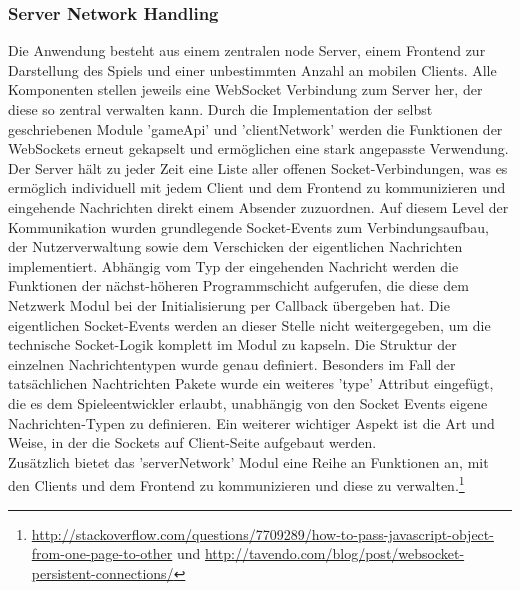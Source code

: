 \documentclass[a4paper]{spie}  %
\begin{document}
\subsubsection{Server Network Handling}
Die Anwendung besteht aus einem zentralen node Server, einem Frontend zur Darstellung des Spiels und einer unbestimmten Anzahl an mobilen Clients. Alle Komponenten stellen jeweils eine WebSocket Verbindung zum Server her, der diese so zentral verwalten kann. Durch die Implementation der selbst geschriebenen Module 'gameApi' und 'clientNetwork' werden die Funktionen der WebSockets erneut gekapselt und ermöglichen eine stark angepasste Verwendung.\\
Der Server hält zu jeder Zeit eine Liste aller offenen Socket-Verbindungen, was es ermöglich individuell mit jedem Client und dem Frontend zu kommunizieren und eingehende Nachrichten direkt einem Absender zuzuordnen. Auf diesem Level der Kommunikation wurden grundlegende Socket-Events zum Verbindungsaufbau, der Nutzerverwaltung sowie dem Verschicken der eigentlichen Nachrichten implementiert. Abhängig vom Typ der eingehenden Nachricht werden die Funktionen der nächst-höheren Programmschicht aufgerufen, die diese dem Netzwerk Modul bei der Initialisierung per Callback übergeben hat. Die eigentlichen Socket-Events werden an dieser Stelle nicht weitergegeben, um die technische Socket-Logik komplett im Modul zu kapseln. Die Struktur der einzelnen Nachrichtentypen wurde genau definiert. Besonders im Fall der tatsächlichen Nachtrichten Pakete wurde ein weiteres 'type' Attribut eingefügt, die es dem Spieleentwickler erlaubt, unabhängig von den Socket Events eigene Nachrichten-Typen zu definieren. Ein weiterer wichtiger Aspekt ist die Art und Weise, in der die Sockets auf Client-Seite aufgebaut werden.\\
Zusätzlich bietet das 'serverNetwork' Modul eine Reihe an Funktionen an, mit den Clients und dem Frontend zu kommunizieren und diese zu verwalten.\footnote{\url{http://stackoverflow.com/questions/7709289/how-to-pass-javascript-object-from-one-page-to-other} und \url{http://tavendo.com/blog/post/websocket-persistent-connections/}}
\end{document}

